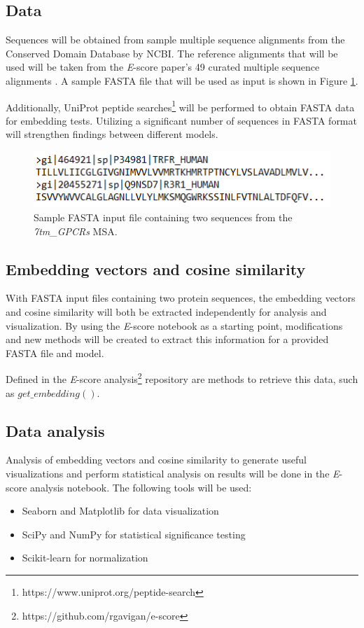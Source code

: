 \documentclass[
	letterpaper, %
	10pt, %
]{journalArticle}
\begin{document}
\subsection{Data}
Sequences will be obtained from sample multiple sequence alignments from the Conserved Domain Database \autocite{Marchler-Bauer:2015} by NCBI. The reference alignments that will be used will be taken from the \textit{E}-score paper's 49 curated multiple sequence alignments \autocite{Ashrafzadeh:2023}. A sample FASTA file that will be used as input is shown in Figure \ref{fig:sequence}.

Additionally, UniProt \autocite{UniProt:2023} peptide searches\footnote{https://www.uniprot.org/peptide-search} will be performed to obtain FASTA data for embedding tests. Utilizing a significant number of sequences in FASTA format will strengthen findings between different models.

\begin{figure} %
	\includegraphics[width=\linewidth]{Figures/sequences.png}
	\caption{Sample FASTA input file containing two sequences from the \textit{7tm\_GPCRs} MSA.}
	\label{fig:sequence}
\end{figure}

\subsection{Embedding vectors and cosine similarity}
With FASTA input files containing two protein sequences, the embedding vectors and cosine similarity will both be extracted independently for analysis and visualization. By using the \textit{E}-score notebook as a starting point, modifications and new methods will be created to extract this information for a provided FASTA file and model.

Defined in the \textit{E}-score analysis\footnote{https://github.com/rgavigan/e-score} repository are methods to retrieve this data, such as \(get\_embedding()\).

\subsection{Data analysis}
Analysis of embedding vectors and cosine similarity to generate useful visualizations and perform statistical analysis on results will be done in the \textit{E}-score analysis notebook. The following tools will be used:
\begin{itemize}
    \item{Seaborn \autocite{Waskom:2021} and Matplotlib \autocite{Hunter:2007} for data visualization}
    \item{SciPy \autocite{Virtanen:2020} and NumPy \autocite{Harris:2020} for statistical significance testing}
    \item{Scikit-learn \autocite{Pedregosa:2011} for normalization}
\end{itemize}
\end{document}
